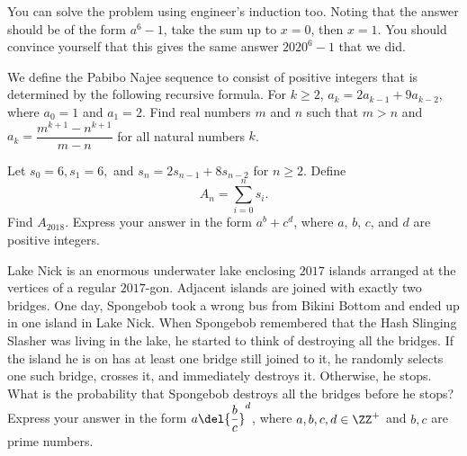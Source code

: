 \documentclass[11pt,paper=letter]{scrartcl}
\begin{document}
\begin{exrboxed}
  You can solve the problem using engineer's induction too. Noting that the answer should be of the form $a^6 - 1$, take the sum up to $x = 0$, then $x = 1$. You should convince yourself that this gives the same answer $2020^6 - 1$ that we did.
\end{exrboxed}

\begin{mdframed}[style=exmdbox]

\begin{problem}[Mathira 2018/T3-2]
  We define the Pabibo Najee sequence to consist of positive integers that is determined by the following recursive formula. For $k \ge 2$, $a_k = 2a_{k-1} + 9a_{k-2}$, where $a_0 = 1$ and $a_1 = 2$. Find real numbers $m$ and $n$ such that $m > n$ and $a_k = \dfrac{m^{k+1} - n^{k+1}}{m - n}$ for all natural numbers $k$.
\end{problem}

\begin{problem}
  Let $s_0 = 6, s_1 = 6,$ and $s_n = 2s_{n-1} + 8s_{n-2}$ for $n \geq 2$. Define $$A_n = \sum_{i=0}^n s_i.$$ Find $A_{2018}$. Express your answer in the form $a^b + c^d$, where $a$, $b$, $c$, and $d$ are positive integers.
\end{problem}

\begin{problem}
  Lake Nick is an enormous underwater lake enclosing $2017$ islands arranged at the vertices of a regular $2017$-gon. Adjacent islands are joined with exactly two bridges. One day, Spongebob took a wrong bus from Bikini Bottom and ended up in one island in Lake Nick. When Spongebob remembered that the Hash Slinging Slasher was living in the lake, he started to think of destroying all the bridges. If the island he is on has at least one bridge still joined to it, he randomly selects one such bridge, crosses it, and immediately destroys it. Otherwise, he stops. What is the probability that Spongebob destroys all the bridges before he stops? Express your answer in the form $a\del{\dfrac b c}^d$, where $a,b,c,d \in \ZZ^+$ and $b, c$ are prime numbers. \hint{\ref{h:10}} %
\end{problem}


\end{mdframed}
\end{document}
